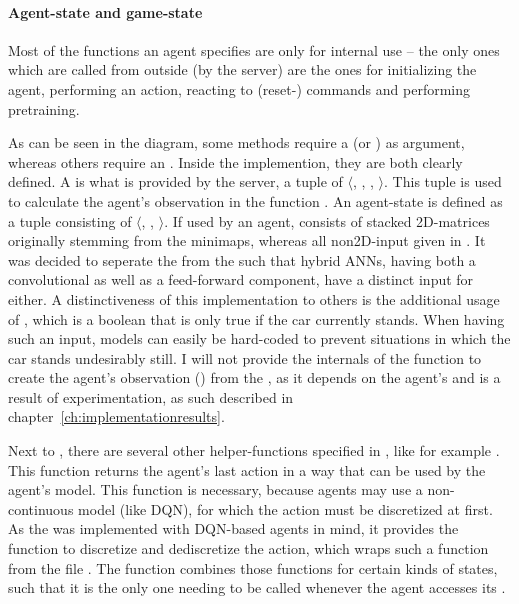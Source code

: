 \paragraph{Agent-state and game-state}

Most of the functions an agent specifies are only for internal use -- the only ones which are called from outside (by the server) are the ones for initializing the agent, performing an action, reacting to (reset-) commands and performing pretraining.

As can be seen in the diagram, some methods require a  (or ) as argument, whereas others require an . Inside the implemention, they are both clearly defined. A  is what is provided by the server, a tuple of $\langle$, , , $\rangle$. This tuple is used to calculate the agent's observation in the function . An agent-state is defined as a tuple consisting of $\langle$, , $\rangle$. If used by an agent,  consists of stacked 2D-matrices originally stemming from the minimaps, whereas all non2D-input given in . It was decided to seperate the  from the  such that hybrid ANNs, having both a convolutional as well as a feed-forward component, have a distinct input for either. A distinctiveness of this implementation to others is the additional usage of , which is a boolean that is only true if the car currently stands. When having such an input, models can easily be hard-coded to prevent situations in which the car stands undesirably still. I will not provide the internals of the function to create the agent's observation () from the , as it depends on the agent's  and is a result of experimentation, as such described in chapter~\ref{ch:implementationresults}.

Next to , there are several other helper-functions specified in , like for example . This function returns the agent's last action in a way that can be used by the agent's model. This function is necessary, because agents may use a non-continuous model (like DQN), for which the action must be discretized at first. As the  was implemented with DQN-based agents in mind, it provides the function to discretize and dediscretize the action, which wraps such a function from the file . The function  combines those functions for certain kinds of states, such that it is the only one needing to be called whenever the agent accesses its .


